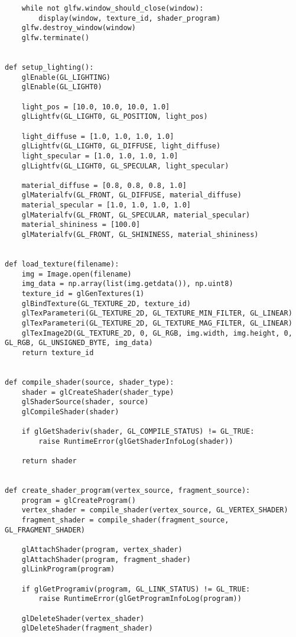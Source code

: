 \documentclass[a4paper, 14pt]{extarticle}
\begin{document}
\begin{lstlisting}
    while not glfw.window_should_close(window):
        display(window, texture_id, shader_program)
    glfw.destroy_window(window)
    glfw.terminate()


def setup_lighting():
    glEnable(GL_LIGHTING)
    glEnable(GL_LIGHT0)

    light_pos = [10.0, 10.0, 10.0, 1.0]
    glLightfv(GL_LIGHT0, GL_POSITION, light_pos)

    light_diffuse = [1.0, 1.0, 1.0, 1.0]
    glLightfv(GL_LIGHT0, GL_DIFFUSE, light_diffuse)
    light_specular = [1.0, 1.0, 1.0, 1.0]
    glLightfv(GL_LIGHT0, GL_SPECULAR, light_specular)

    material_diffuse = [0.8, 0.8, 0.8, 1.0]
    glMaterialfv(GL_FRONT, GL_DIFFUSE, material_diffuse)
    material_specular = [1.0, 1.0, 1.0, 1.0]
    glMaterialfv(GL_FRONT, GL_SPECULAR, material_specular)
    material_shininess = [100.0]
    glMaterialfv(GL_FRONT, GL_SHININESS, material_shininess)


def load_texture(filename):
    img = Image.open(filename)
    img_data = np.array(list(img.getdata()), np.uint8)
    texture_id = glGenTextures(1)
    glBindTexture(GL_TEXTURE_2D, texture_id)
    glTexParameteri(GL_TEXTURE_2D, GL_TEXTURE_MIN_FILTER, GL_LINEAR)
    glTexParameteri(GL_TEXTURE_2D, GL_TEXTURE_MAG_FILTER, GL_LINEAR)
    glTexImage2D(GL_TEXTURE_2D, 0, GL_RGB, img.width, img.height, 0, GL_RGB, GL_UNSIGNED_BYTE, img_data)
    return texture_id


def compile_shader(source, shader_type):
    shader = glCreateShader(shader_type)
    glShaderSource(shader, source)
    glCompileShader(shader)

    if glGetShaderiv(shader, GL_COMPILE_STATUS) != GL_TRUE:
        raise RuntimeError(glGetShaderInfoLog(shader))

    return shader


def create_shader_program(vertex_source, fragment_source):
    program = glCreateProgram()
    vertex_shader = compile_shader(vertex_source, GL_VERTEX_SHADER)
    fragment_shader = compile_shader(fragment_source, GL_FRAGMENT_SHADER)

    glAttachShader(program, vertex_shader)
    glAttachShader(program, fragment_shader)
    glLinkProgram(program)

    if glGetProgramiv(program, GL_LINK_STATUS) != GL_TRUE:
        raise RuntimeError(glGetProgramInfoLog(program))

    glDeleteShader(vertex_shader)
    glDeleteShader(fragment_shader)


\end{lstlisting}
\end{document}

